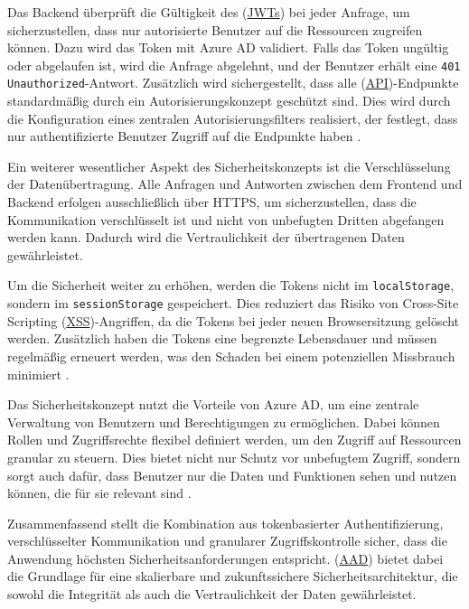 Das Backend überprüft die Gültigkeit des (\hyperref[abkuerzungen]{JWTs}) bei jeder Anfrage, um sicherzustellen, dass nur autorisierte Benutzer auf die Ressourcen zugreifen können. Dazu wird das Token mit Azure AD validiert. Falls das Token ungültig oder abgelaufen ist, wird die Anfrage abgelehnt, und der Benutzer erhält eine \texttt{401 Unauthorized}-Antwort. Zusätzlich wird sichergestellt, dass alle (\hyperref[abkuerzungen]{API})-Endpunkte standardmäßig durch ein Autorisierungskonzept geschützt sind. Dies wird durch die Konfiguration eines zentralen Autorisierungsfilters realisiert, der festlegt, dass nur authentifizierte Benutzer Zugriff auf die Endpunkte haben \cite{jwt2015}.

Ein weiterer wesentlicher Aspekt des Sicherheitskonzepts ist die Verschlüsselung der Datenübertragung. Alle Anfragen und Antworten zwischen dem Frontend und Backend erfolgen ausschließlich über HTTPS, um sicherzustellen, dass die Kommunikation verschlüsselt ist und nicht von unbefugten Dritten abgefangen werden kann. Dadurch wird die Vertraulichkeit der übertragenen Daten gewährleistet.

Um die Sicherheit weiter zu erhöhen, werden die Tokens nicht im \texttt{localStorage}, sondern im \texttt{sessionStorage} gespeichert. Dies reduziert das Risiko von Cross-Site Scripting (\hyperref[abkuerzungen]{XSS})-Angriffen, da die Tokens bei jeder neuen Browsersitzung gelöscht werden. Zusätzlich haben die Tokens eine begrenzte Lebensdauer und müssen regelmäßig erneuert werden, was den Schaden bei einem potenziellen Missbrauch minimiert \cite{xssSecurity}.

Das Sicherheitskonzept nutzt die Vorteile von Azure AD, um eine zentrale Verwaltung von Benutzern und Berechtigungen zu ermöglichen. Dabei können Rollen und Zugriffsrechte flexibel definiert werden, um den Zugriff auf Ressourcen granular zu steuern. Dies bietet nicht nur Schutz vor unbefugtem Zugriff, sondern sorgt auch dafür, dass Benutzer nur die Daten und Funktionen sehen und nutzen können, die für sie relevant sind \cite{aad2023}.

Zusammenfassend stellt die Kombination aus tokenbasierter Authentifizierung, verschlüsselter Kommunikation und granularer Zugriffskontrolle sicher, dass die Anwendung höchsten Sicherheitsanforderungen entspricht. (\hyperref[abkuerzungen]{AAD}) bietet dabei die Grundlage für eine skalierbare und zukunftssichere Sicherheitsarchitektur, die sowohl die Integrität als auch die Vertraulichkeit der Daten gewährleistet.

